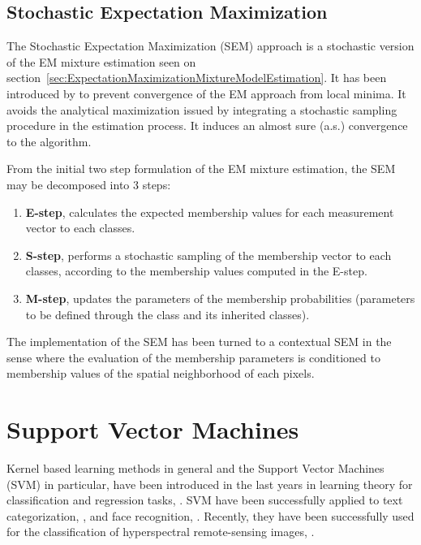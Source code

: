 \subsection{Stochastic Expectation Maximization}
\label{sec:SEM}

The Stochastic Expectation Maximization (SEM) approach is a stochastic 
version of the EM mixture estimation seen on
section~\ref{sec:ExpectationMaximizationMixtureModelEstimation}. It has been 
introduced by \cite{CeDi95} to prevent convergence of the EM approach from
local minima. It avoids the analytical maximization issued by integrating a
stochastic sampling procedure in the estimation process. It induces an almost
sure (a.s.) convergence to the algorithm.

From the initial two step formulation of the EM mixture estimation, the SEM
may be decomposed into 3 steps:
\begin{enumerate}
\item \textbf{E-step}, calculates the expected membership values for each 
measurement vector to each classes.
\item \textbf{S-step}, performs a stochastic sampling of the membership vector
to each classes, according to the membership values computed in the E-step.
\item \textbf{M-step}, updates the parameters of the membership probabilities
(parameters to be defined through the class
 and its inherited classes).
\end{enumerate}
The implementation of the SEM has been turned to a contextual SEM in the sense
where the evaluation of the membership parameters is conditioned to
membership values of the spatial neighborhood of each pixels.

\ifitkFullVersion 

\fi



\section{Support Vector Machines}
\label{sec:SupportVectorMachines}

Kernel based learning methods in general and the Support Vector
Machines (SVM) in particular, have been introduced in the last years
in learning theory for classification and regression tasks,
\cite{vapnik}. SVM have been successfully applied to text
categorization, \cite{joachims}, and face recognition,
\cite{osuna}. Recently, they have been successfully used for the
classification of hyperspectral remote-sensing images, \cite{bruzzoneSVM}.

